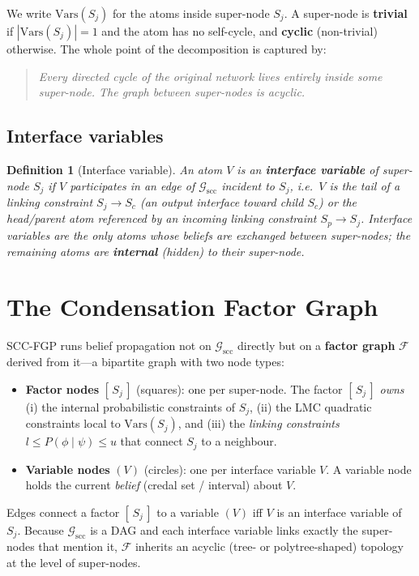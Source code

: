 \documentclass[11pt]{article}
\newtheorem{definition}{Definition}
\newcommand{\cG}{\mathcal{G}}
\newcommand{\cF}{\mathcal{F}}
\newcommand{\scc}{\mathrm{scc}}
\newcommand{\Vars}{\mathrm{Vars}}
\begin{document}
We write $\Vars(S_j)$ for the atoms inside super-node $S_j$. A super-node is
\textbf{trivial} if $|\Vars(S_j)|=1$ and the atom has no self-cycle, and
\textbf{cyclic} (non-trivial) otherwise. The whole point of the
decomposition is captured by:

\begin{quote}
\emph{Every directed cycle of the original network lives entirely inside some
super-node. The graph \emph{between} super-nodes is acyclic.}
\end{quote}

\subsection{Interface variables}

\begin{definition}[Interface variable]
An atom $V$ is an \textbf{interface variable} of super-node $S_j$ if $V$
participates in an edge of $\cG_{\scc}$ incident to $S_j$, i.e.\ $V$ is the
\emph{tail} of a linking constraint $S_j\!\to\!S_c$ (an output interface
toward child $S_c$) or the \emph{head/parent} atom referenced by an incoming
linking constraint $S_p\!\to\!S_j$. Interface variables are the only atoms
whose beliefs are exchanged between super-nodes; the remaining atoms are
\textbf{internal} (hidden) to their super-node.
\end{definition}

\section{The Condensation Factor Graph}\label{sec:fg}

SCC-FGP runs belief propagation not on $\cG_{\scc}$ directly but on a
\textbf{factor graph} $\cF$ derived from it---a bipartite graph with two node
types:
\begin{itemize}
  \item \textbf{Factor nodes} $[\,S_j\,]$ (squares): one per super-node. The
        factor $[\,S_j\,]$ \emph{owns} (i) the internal probabilistic
        constraints of $S_j$, (ii) the LMC quadratic constraints local to
        $\Vars(S_j)$, and (iii) the \emph{linking constraints}
        $l\le P(\phi\mid\psi)\le u$ that connect $S_j$ to a neighbour.
  \item \textbf{Variable nodes} $(V)$ (circles): one per interface variable
        $V$. A variable node holds the current \emph{belief} (credal set /
        interval) about $V$.
\end{itemize}
Edges connect a factor $[\,S_j\,]$ to a variable $(V)$ iff $V$ is an interface
variable of $S_j$. Because $\cG_{\scc}$ is a DAG and each interface variable
links exactly the super-nodes that mention it, $\cF$ inherits an acyclic
(tree- or polytree-shaped) topology at the level of super-nodes.
\end{document}
